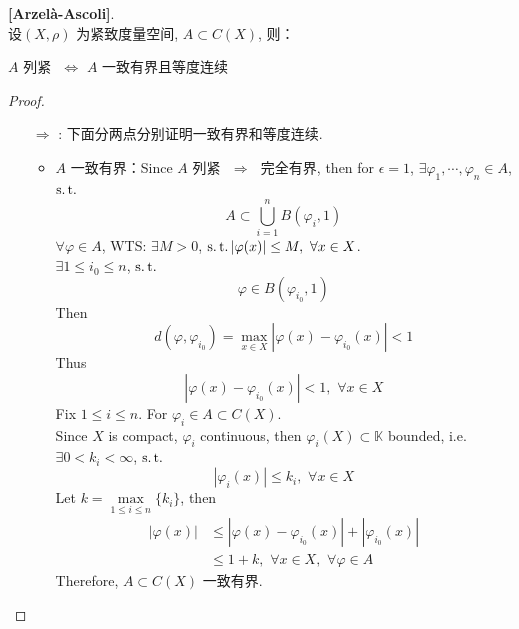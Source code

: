 	\begin{thm}\label{thm 1.8.1}
		\textbf{[Arzel\`{a}-Ascoli]}. \\
		设$(X , \rho)$ 为紧致度量空间, $A \subset C(X)$, 则：
		\begin{center}
			$A$ 列紧 $\,\, \Leftrightarrow \,\, A$ 一致有界且等度连续
		\end{center}
		
		\vspace{4em}
		
		\begin{proof}
			\begin{enumerate}
				\item[$\Rightarrow$]: 下面分两点分别证明一致有界和等度连续.
				\begin{itemize}
					\item $A$ 一致有界：Since $A$ 列紧 $\,\, \Rightarrow \,\,$ 完全有界, then for $\epsilon = 1$, $\exists \varphi_1 , \cdots , \varphi_n \in A$, $\operatorname{s.t.}$
					\[ A \subset \bigcup_{i = 1}^{n} B(\varphi_i , 1) \]
					$\forall \varphi \in A$, WTS: $\exists M > 0$, $\operatorname{s.t.} \left| \varphi(x) \right| \leq M , \,\, \forall x \in X$. \\
					$\exists 1 \leq i_0 \leq n$, $\operatorname{s.t.}$
					\[ \varphi \in B(\varphi_{i_0} , 1) \]
					Then
					\[ d(\varphi , \varphi_{i_0}) = \max_{x \in X} \left| \varphi(x) - \varphi_{i_0}(x) \right| < 1 \]
					Thus
					\[ \left| \varphi(x) - \varphi_{i_0}(x) \right| < 1 , \,\, \forall x \in X \]
					Fix $1 \leq i \leq n$. For $\varphi_i \in A \subset C(X)$. \\
					Since $X$ is compact, $\varphi_i$ continuous, then $\varphi_{i}(X) \subset \mathbb{K}$ bounded, i.e. $\exists 0 < k_i < \infty$, $\operatorname{s.t.}$
					\[ \left| \varphi_{i}(x) \right| \leq k_i , \,\, \forall x \in X \]
					Let $k = \underset{1 \leq i \leq n}{\max}{\{ k_i \}}$, then
					\begin{align}
						\left| \varphi(x) \right| 
						&\leq \left| \varphi(x) - \varphi_{i_0}(x) \right| + \left| \varphi_{i_0}(x) \right| \\
						&\leq 1 + k , \,\, \forall x \in X , \,\, \forall \varphi \in A
					\end{align}
					Therefore, $A \subset C(X)$ 一致有界.
					
					\newpage
					

\end{itemize}
\end{enumerate}
\end{proof}
\end{thm}
